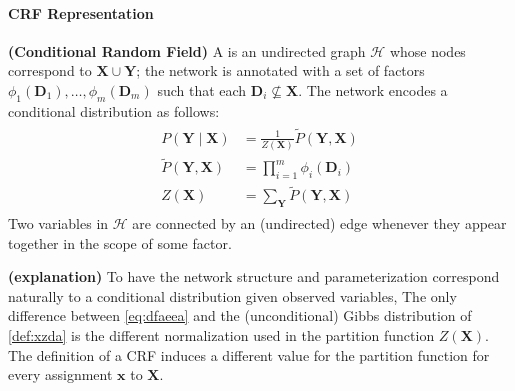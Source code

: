 \documentclass{article}
\newcommand{\bfs}[1]{\textbf{({#1}) }}
\begin{document}
\paragraph{CRF Representation}
\begin{defa}\bfs{Conditional Random Field}\label{def:crf}
A  is an undirected graph $\mathcal{H}$ whose nodes correspond to $\boldsymbol{X} \cup \boldsymbol{Y}$; the network is annotated with a set of factors $\phi_{1}\left(\boldsymbol{D}_{1}\right), \ldots, \phi_{m}\left(\boldsymbol{D}_{m}\right)$ such that each $\boldsymbol{D}_{i} \not \subseteq \boldsymbol{X}$. The network encodes a conditional distribution as follows:
\begin{align}
\begin{aligned}
P(\boldsymbol{Y} \mid \boldsymbol{X}) &=\frac{1}{Z(\boldsymbol{X})} \tilde{P}(\boldsymbol{Y}, \boldsymbol{X}) \\
\tilde{P}(\boldsymbol{Y}, \boldsymbol{X}) &=\prod_{i=1}^{m} \phi_{i}\left(\boldsymbol{D}_{i}\right) \\
Z(\boldsymbol{X}) &=\sum_{\boldsymbol{Y}} \tilde{P}(\boldsymbol{Y}, \boldsymbol{X})
\end{aligned}\label{eq:dfaeea}
\end{align}
Two variables in $\mathcal{H}$ are connected by an (undirected) edge whenever they appear together in the scope of some factor.
\end{defa}
\begin{rema}\bfs{explanation}
 To have the network structure and parameterization correspond naturally to a conditional distribution given observed variables,  The only difference between \cref{eq:dfaeea} and the (unconditional) Gibbs distribution of \cref{def:xzda} is the different normalization used in the partition function $Z(\boldsymbol{X})$. The definition of a CRF induces a different value for the partition function for every assignment $\boldsymbol{x}$ to $\boldsymbol{X}$. 
\end{rema}
\end{document}
